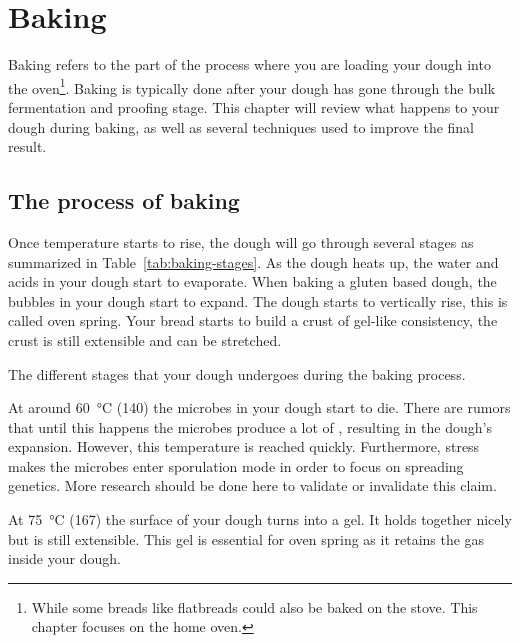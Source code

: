 \chapter{Baking}%
\label{chapter:baking}
\begin{quoting}
Baking refers to the part of the process where you are loading your dough into
the oven\footnote{While some breads like flatbreads could also be baked on the
stove. This chapter focuses on the home oven.}.  Baking is typically done after
your dough has gone through the bulk fermentation and proofing stage.  This
chapter will review what happens to your dough during baking, as well as
several techniques used to improve the final result.
\end{quoting}

\section{The process of baking}
Once temperature starts to rise, the dough will go through several stages as
summarized in Table~\ref{tab:baking-stages}.  As the dough heats up, the water
and acids in your dough start to evaporate. When baking a gluten based dough,
the bubbles in your dough start to expand.  The dough starts to vertically
rise, this is called oven spring.  Your bread starts to build a crust of
gel-like consistency, the crust is still extensible and can be stretched.

\begin{table}[htp!]
    \centering
        
        \caption[Stages of dough during baking]{The different stages that
            your dough undergoes during the baking process.}%
        \label{tab:baking-stages}
\end{table}

At around  \qty{60}{\degreeCelsius} (\qty{140}{\degF}) the microbes in your dough start to die.
There are rumors that until this happens the microbes produce
a lot of , resulting in the dough's expansion. However, this temperature
is reached quickly. Furthermore, stress makes the microbes
enter sporulation mode in order to focus on spreading genetics.
More research should be done here to validate or invalidate this
claim.

At  \qty{75}{\degreeCelsius} (\qty{167}{\degF}) the surface of your dough turns into a gel. It
holds together nicely but is still extensible. This gel is essential
for oven spring as it retains the gas inside your dough.

